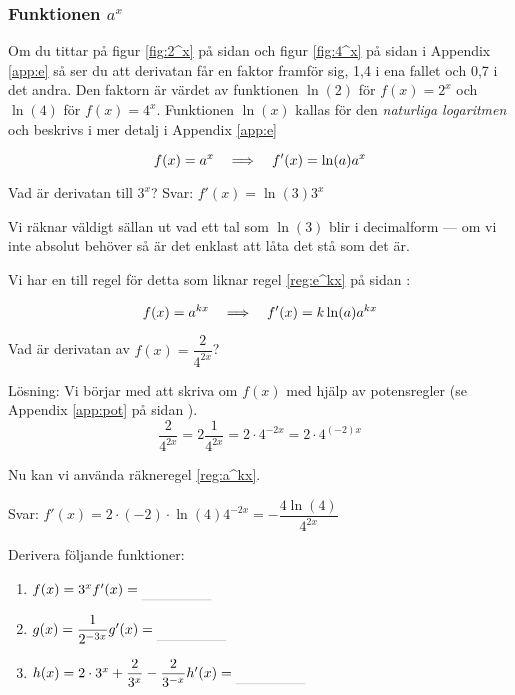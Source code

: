 \documentclass[a4paper, 12pt]{article}
\begin{document}
\subsubsection{Funktionen $a^x$}
Om du tittar på figur \ref*{fig:2^x} på sidan \pageref*{fig:2^x} och figur \ref*{fig:4^x} på sidan \pageref*{fig:4^x} i Appendix \ref*{app:e} så ser du att derivatan får en faktor framför sig, 1,4 i ena fallet och 0,7 i det andra. Den faktorn är värdet av funktionen $\ln(2)$ för $f(x) = 2^x$ och $\ln(4)$ för $f(x) = 4^x$. Funktionen $\ln (x)$ kallas för den \emph{naturliga logaritmen} och beskrivs i mer detalj i Appendix \ref*{app:e}


\begin{regel}
    \label{reg:a^x}
    \[f(x) = a^x \hspace{1em} \Longrightarrow \hspace{1em} f'(x) = \ln (a) a^x \]
\end{regel}


\begin{exempel}
    \label{ex:a^x}
    Vad är derivatan till $3^x$?
    Svar: $f'(x) = \ln (3) 3^x$
\end{exempel}

Vi räknar väldigt sällan ut vad ett tal som $\ln(3)$ blir i decimalform --- om vi inte absolut behöver så är det enklast att låta det stå som det är.

Vi har en till regel för detta som liknar regel \ref*{reg:e^kx} på sidan \pageref*{reg:e^kx}:

\begin{regel}
    \label{reg:a^kx}
    \[f(x) = a^{kx} \hspace{1em} \Longrightarrow \hspace{1em} f'(x) = k\ln(a)a^{kx}\]
\end{regel}


\begin{exempel}
    Vad är derivatan av $f(x) = \dfrac 2{4^{2x}}$?
    
    Lösning: Vi börjar med att skriva om $f(x)$ med hjälp av potensregler (se Appendix \ref*{app:pot} på sidan \pageref*{app:pot}).
    \[\dfrac{2}{4^{2x}} = 2\dfrac{1}{4^{2x}} = 2\cdot 4^{-2x} = 2\cdot 4^{(-2)x}\]

    Nu kan vi använda räkneregel \ref*{reg:a^kx}.

    Svar: $f'(x) = 2\cdot (-2) \cdot \ln(4) 4^{-2x} = - \dfrac {4\ln(4)} {4^{2x}}$
\end{exempel}

\begin{uppgifter}
    \label{upp:a^kx}
    Derivera följande funktioner:
    \begin{multicols}{3}
        \begin{enumerate}
            \item $f(x) = 3^x \\ f'(x) \ans$
            \item $g(x) = \dfrac{1}{2^{-3x}} \\ g'(x) \ans$
            \item $h(x) = 2\cdot 3^x + \dfrac 2{3^x} - \dfrac 2{3^{-x}} \\ h'(x) \ans$
        \end{enumerate}
    \end{multicols}
\end{uppgifter}
\end{document}
